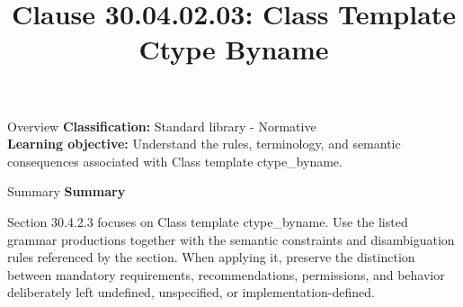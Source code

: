 \documentclass[10pt,letterpaper]{article}
\title{Clause 30.04.02.03: Class Template Ctype Byname}
\author{}
\date{}
\begin{document}
\maketitle
\begin{CornellOverviewBox}{Overview}
\textbf{Classification:} Standard library - Normative\\[2pt]
\textbf{Learning objective:} Understand the rules, terminology, and semantic consequences associated with Class template ctype\_byname.
\end{CornellOverviewBox}\begin{CornellSummaryBox}{Summary}
{\sffamily\bfseries\color{Accent} Summary}\par\vspace{3pt}Section 30.4.2.3 focuses on Class template ctype\_byname. Use the listed grammar productions together with the semantic constraints and disambiguation rules referenced by the section. When applying it, preserve the distinction between mandatory requirements, recommendations, permissions, and behavior deliberately left undefined, unspecified, or implementation-defined.
\end{CornellSummaryBox}
\end{document}
